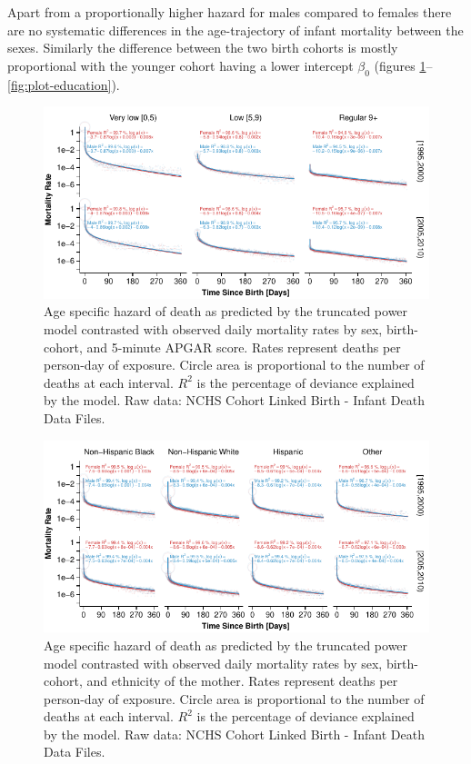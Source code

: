 \documentclass[smallextended]{svjour3} %
\makeatletter
\def\maxwidth{\ifdim\Gin@nat@width>\linewidth\linewidth
\else\Gin@nat@width\fi}
\let\Oldincludegraphics\includegraphics
\renewcommand{\includegraphics}[1]{\Oldincludegraphics[width=\maxwidth]{#1}}
\makeatother
\begin{document}
Apart from a proportionally higher hazard for males compared to females
there are no systematic differences in the age-trajectory of infant
mortality between the sexes. Similarly the difference between the two
birth cohorts is mostly proportional with the younger cohort having a
lower intercept \(\beta_0\) (figures
\ref{fig:plot-apgar}--\ref{fig:plot-education}).

\begin{figure}
\centering
\includegraphics{fig/plot_apgar.pdf}
\caption{\label{fig:plot-apgar}Age specific hazard of death as predicted by
the truncated power model contrasted with observed daily mortality rates
by sex, birth-cohort, and 5-minute APGAR score. Rates represent deaths
per person-day of exposure. Circle area is proportional to the number of
deaths at each interval. \(R^2\) is the percentage of deviance explained
by the model. Raw data: NCHS Cohort Linked Birth - Infant Death Data
Files.}
\end{figure}

\begin{figure}
\centering
\includegraphics{fig/plot_origin.pdf}
\caption{\label{fig:plot-origin}Age specific hazard of death as predicted by
the truncated power model contrasted with observed daily mortality rates
by sex, birth-cohort, and ethnicity of the mother. Rates represent
deaths per person-day of exposure. Circle area is proportional to the
number of deaths at each interval. \(R^2\) is the percentage of deviance
explained by the model. Raw data: NCHS Cohort Linked Birth - Infant
Death Data Files.}
\end{figure}
\end{document}
